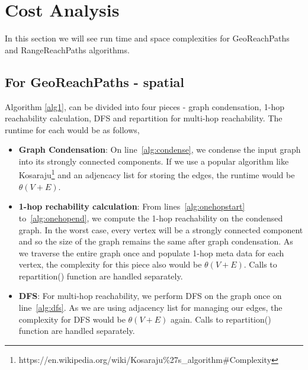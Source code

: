 \section{Cost Analysis}

In this section we will see run time and space complexities for GeoReachPaths and RangeReachPaths algorithms.

\subsection{For GeoReachPaths - spatial}
Algorithm \ref{alg1}, can be divided into four pieces - graph condensation, 1-hop reachability calculation, DFS and repartition for multi-hop reachability. The runtime for each would be as follows,
\begin{itemize}
  \item \textbf{Graph Condensation}: On line~\ref{alg:condense}, we condense the input graph into its strongly connected components. If we use a popular algorithm like Kosaraju\footnote{https://en.wikipedia.org/wiki/Kosaraju\%27s\_algorithm\#Complexity} and an adjencacy list for storing the edges, the runtime would be $\theta(V + E)$.

  \item \textbf{1-hop rechability calculation}: From lines~\ref{alg:onehopstart} to~\ref{alg:onehopend}, we compute the 1-hop reachability on the condensed graph. In the worst case, every vertex will be a strongly connected component and so the size of the graph remains the same after graph condensation. As we traverse the entire graph once and populate 1-hop meta data for each vertex, the complexity for this piece also would be $\theta(V + E)$. Calls to repartition() function are handled separately.

  \item \textbf{DFS}: For multi-hop reachability, we perform DFS on the graph once on line~\ref{alg:dfs}. As we are using adjacency list for managing our edges, the complexity for DFS would be $\theta(V + E)$ again. Calls to repartition() function are handled separately.


\end{itemize}
